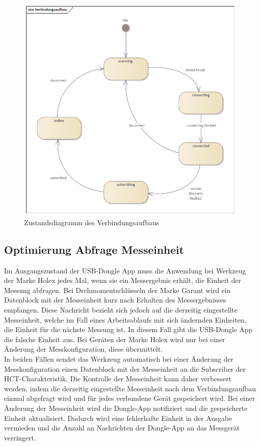 \begin{figure}[H] 
	\centering
	\includegraphics[width=\textwidth]{figures/Verbindungsaufbau.png}
	\caption{Zustandsdiagramm des Verbindungsaufbaus}
\end{figure}



\subsection{Optimierung Abfrage Messeinheit} 
Im Ausgangszustand der USB-Dongle App muss die Anwendung bei Werkzeug der Marke Holex jedes Mal, wenn sie ein Messergebnis erhält, die Einheit der Messung abfragen. Bei Drehmomentschlüsseln der Marke Garant wird ein Datenblock mit der Messeinheit kurz nach Erhalten des Messergebnisses empfangen. Diese Nachricht bezieht sich jedoch auf die derzeitig eingestellte Messeinheit, welche im Fall eines Arbeitsablaufs mit sich ändernden Einheiten, die Einheit für die nächste Messung ist. In diesem Fall gibt die USB-Dongle App die falsche Einheit aus. Bei Geräten der Marke Holex wird nur bei einer Änderung der Messkonfiguration, diese übermittelt.\\
In beiden Fällen sendet das Werkzeug automatisch bei einer Änderung der Messkonfiguration einen Datenblock mit der Messeinheit an die Subscriber der HCT-Charakteristik. Die Kontrolle der Messeinheit kann daher verbessert werden, indem die derzeitig eingestellte Messeinheit nach dem Verbindungsaufbau einmal abgefragt wird und für jedes verbundene Gerät gespeichert wird. Bei einer Änderung der Messeinheit wird die Dongle-App notifiziert und die gespeicherte Einheit aktualisiert. Dadurch wird eine fehlerhafte Einheit in der Ausgabe vermieden und die Anzahl an Nachrichten der Dongle-App an das Messgerät verringert.

